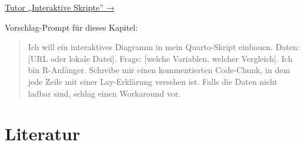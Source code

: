 \documentclass[
  ngerman,
  a4paper,
  DIV=11]{scrreprt}
\begin{document}
\begin{tcolorbox}[enhanced jigsaw, opacitybacktitle=0.6, leftrule=.75mm, title=\textcolor{quarto-callout-tip-color}{\faLightbulb}\hspace{0.5em}{Tutor öffnen}, colframe=quarto-callout-tip-color-frame, arc=.35mm, toprule=.15mm, colbacktitle=quarto-callout-tip-color!10!white, bottomrule=.15mm, colback=white, rightrule=.15mm, breakable, toptitle=1mm, bottomtitle=1mm, opacityback=0, titlerule=0mm, coltitle=black, left=2mm]

\href{https://chatgpt.com/g/g-69fec93348108191af1ffb8ce0cf6712-tutor-interaktive-skripte}{Tutor
„Interaktive Skripte'' →}

Vorschlag-Prompt für dieses Kapitel:

\begin{quote}
Ich will ein interaktives Diagramm in mein Quarto-Skript einbauen.
Daten: {[}URL oder lokale Datei{]}. Frage: {[}welche Variablen, welcher
Vergleich{]}. Ich bin R-Anfänger. Schreibe mir einen kommentierten
Code-Chunk, in dem jede Zeile mit einer Lay-Erklärung versehen ist.
Falls die Daten nicht ladbar sind, schlag einen Workaround vor.
\end{quote}

\end{tcolorbox}

\chapter*{Literatur}\label{literatur-4}

\end{document}
